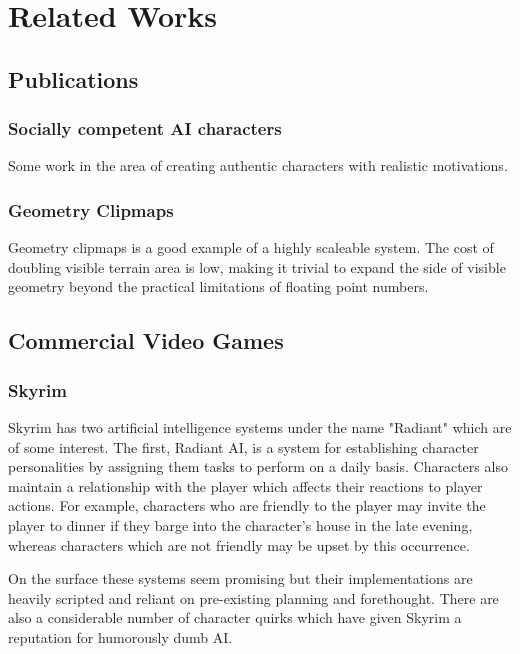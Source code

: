 
\chapter{Related Works}

\section{Publications}

\subsection{Socially competent AI characters}

Some work in the area of creating authentic characters with realistic motivations. \cite{socially_competent}

\subsection{Geometry Clipmaps}

Geometry clipmaps is a good example of a highly scaleable system. The cost of doubling visible terrain area is low, making it trivial to expand the side of visible geometry beyond the practical limitations of floating point numbers. \cite{geometry_clipmaps}

\section{Commercial Video Games}

\subsection{Skyrim}

Skyrim has two artificial intelligence systems under the name "Radiant" which are of some interest. The first, Radiant AI, is a system for establishing character personalities by assigning them tasks to perform on a daily basis. Characters also maintain a relationship with the player which affects their reactions to player actions. For example, characters who are friendly to the
player may invite the player to dinner if they barge into the character's house in the late evening, whereas characters which are not friendly may be upset by this occurrence.

On the surface these systems seem promising but their implementations are heavily scripted and reliant on pre-existing planning and forethought. There are also a considerable number of character quirks which have given Skyrim a reputation for humorously dumb AI. \cite{skyrim_gamespy} \cite{skyrim_ign} \cite{gameinformer_skyrimtech} \cite{skyrim_nesmith_radiant} \cite{skyrim_whatsnew}

